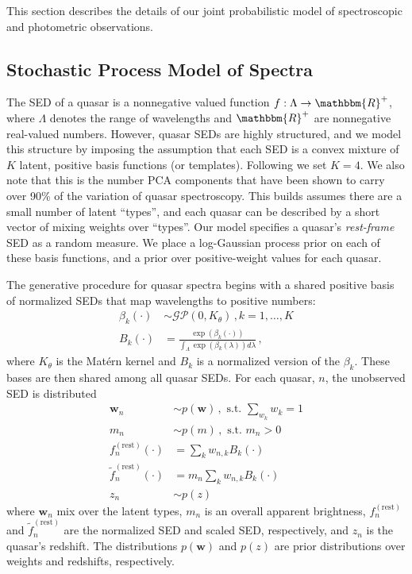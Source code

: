 \documentclass{article}
\newcommand{\R}{\mathbbm{R}}
\begin{document}
\label{sec:model}
This section describes the details of our joint probabilistic model of spectroscopic and photometric observations.  

\subsection{Stochastic Process Model of Spectra}
The SED of a quasar is a nonnegative valued function $f : \Lambda \rightarrow \R^+$, where $\Lambda$ denotes the range of wavelengths and $\R^+$ are nonnegative real-valued numbers.  However, quasar SEDs are highly structured, and we model this structure by imposing the assumption that each SED is a convex mixture of $K$ latent, positive basis functions (or templates). 
Following \citet{budavari2001photometric} we set $K = 4$.  We also note that this is the number PCA components that have been shown to carry over 90\% of the variation of quasar spectroscopy\citet{suzuki2006quasar}. 
This builds assumes there are a small number of latent ``types'', and each quasar can be described by a short vector of mixing weights over ``types''. 
Our model specifies a quasar's \emph{rest-frame} SED as a random measure. 
We place a log-Gaussian process prior on each of these basis functions, and a prior over positive-weight values for each quasar.  

The generative procedure for quasar spectra begins with a shared positive basis of normalized SEDs
that map wavelengths to positive numbers:
\begin{align}
  \beta_k(\cdot) &\sim \mathcal{GP}(0, K_\theta) \, , k=1, \dots, K\\
  B_k(\cdot) &= \frac{\exp(\beta_k(\cdot))}{\int_\Lambda \exp(\beta_k(\lambda)) d\lambda}   \, ,
\end{align}
where $K_{\theta}$ is the Mat\'{e}rn kernel and $B_k$ is a normalized version of
the $\beta_k$. These bases are then shared among all quasar SEDs.  For each quasar, $n$, the unobserved SED is distributed
\begin{align}
  \mathbf{w}_n &\sim p(\mathbf{w}) \, , \text{ s.t. } \sum_{w_k} w_k = 1  \\
  m_n  &\sim p(m) \, , \text{ s.t. } m_n > 0 \\
  f^{(\text{rest})}_n(\cdot) &= \sum_{k} w_{n,k} B_k(\cdot)\\
  \tilde f^{(\text{rest})}_n(\cdot) &= m_n \sum_{k} w_{n,k} B_k(\cdot) \\
  z_n &\sim p(z)
\end{align}
where $\mathbf{w}_n$ mix over the latent types, $m_n$ is an overall apparent brightness, $f_n^{(\text{rest})}$ and $\tilde f_n^{(\text{rest})}$ are the normalized SED and scaled SED, respectively, and $z_n$ is the quasar's redshift.  The distributions $p(\mathbf{w})$ and $p(z)$ are prior distributions over weights and redshifts, respectively.  
\end{document}
